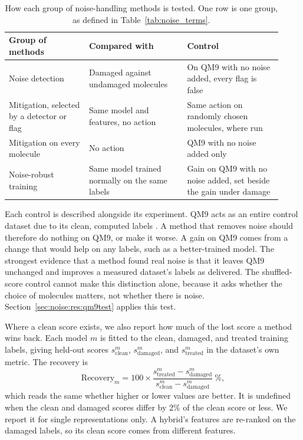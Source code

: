 \begin{table}[htbp]
\centering
\begin{tabular}{@{}p{0.27\linewidth}p{0.33\linewidth}p{0.32\linewidth}@{}}
\toprule
Group of methods & Compared with & Control \\
\midrule
Noise detection & Damaged against undamaged molecules & On QM9 with no noise added, every flag is false \\
Mitigation, selected by a detector or flag & Same model and features, no action & Same action on randomly chosen molecules, where run \\
Mitigation on every molecule & No action & QM9 with no noise added only \\
Noise-robust training & Same model trained normally on the same labels & Gain on QM9 with no noise added, set beside the gain under damage \\
\bottomrule
\end{tabular}
\caption[How each group of methods is tested.]{How each group of noise-handling methods is tested. One row is one group, as defined in Table~\ref{tab:noise_terms}.}
\label{tab:noise:tests}
\end{table}

Each control is described alongside its experiment. QM9 acts as an entire control dataset due to its clean, computed labels \citep{Ramakrishnan2014}. A method that removes noise should therefore do nothing on QM9, or make it worse. A gain on QM9 comes from a change that would help on any labels, such as a better-trained model. The strongest evidence that a method found real noise is that it leaves QM9 unchanged and improves a measured dataset's labels as delivered. The shuffled-score control cannot make this distinction alone, because it asks whether the choice of molecules matters, not whether there is noise. Section~\ref{sec:noise:res:qm9test} applies this test.

Where a clean score exists, we also report how much of the lost score a method wins back. Each model $m$ is fitted to the clean, damaged, and treated training labels, giving held-out scores $s^{m}_{\text{clean}}$, $s^{m}_{\text{damaged}}$, and $s^{m}_{\text{treated}}$ in the dataset's own metric. The recovery is
\begin{equation}
\mathrm{Recovery}_m = 100 \times \frac{s^{m}_{\text{treated}} - s^{m}_{\text{damaged}}}{s^{m}_{\text{clean}} - s^{m}_{\text{damaged}}}\ \%,
\label{eq:recovery}
\end{equation}
which reads the same whether higher or lower values are better. It is undefined when the clean and damaged scores differ by 2\% of the clean score or less. We report it for single representations only. A hybrid's features are re-ranked on the damaged labels, so its clean score comes from different features.


